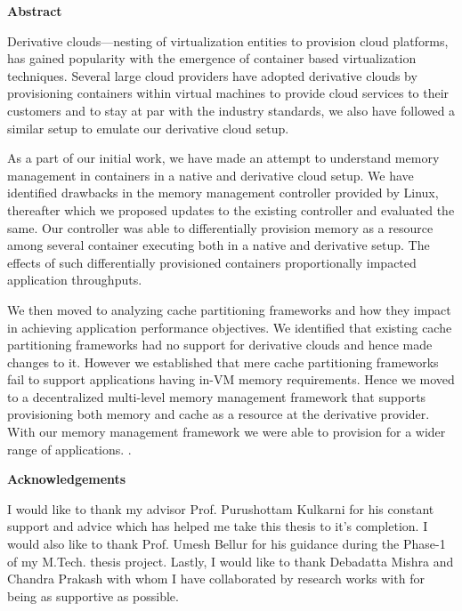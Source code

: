 \documentclass[11pt,a4paper]{report}
\begin{document}
  \begin{center}
    \huge \textbf{Abstract}
  \end{center}
  \vspace*{3em}
  \normalsize 
    
    Derivative clouds---nesting of virtualization entities to provision cloud platforms, has gained popularity 
    with the emergence of container based virtualization techniques. Several large cloud providers have adopted derivative 
    clouds by provisioning containers within virtual machines to provide cloud services to their 
    customers and to stay at par with the industry standards, we also have followed a similar setup to emulate our derivative 
    cloud setup.
    
    As a part of our initial work, we have made an attempt to understand memory management in containers in a native
    and derivative cloud setup. We have identified drawbacks in the memory management controller provided by Linux, thereafter which
    we proposed updates to the existing controller and evaluated the same. Our controller was able to differentially provision memory as
    a resource among several container executing both in a native and derivative setup. The effects of such differentially 
    provisioned containers proportionally impacted application throughputs.
    
    We then moved to analyzing cache partitioning frameworks and how they impact in achieving application performance 
    objectives. We identified that existing cache partitioning frameworks had no support for derivative clouds and
    hence made changes to it. However we established that mere cache partitioning frameworks fail to support applications 
    having in-VM memory requirements. Hence we moved to a decentralized multi-level memory management framework that
    supports provisioning both memory and cache as a resource at the derivative provider. With our memory 
    management framework we were able to provision for a wider range of applications. 
  . 
    
    \newpage
    \begin{center}
      \huge \textbf{Acknowledgements}
    \end{center}
    \vspace*{3em}
    \normalsize 
    
    I would like to thank my advisor Prof. Purushottam Kulkarni for his constant support and advice which has helped me take 
    this thesis to it’s completion. I would also like to thank Prof. Umesh Bellur for his guidance during the Phase-1 of my 
    M.Tech. thesis project. Lastly, I would like to thank Debadatta Mishra and Chandra Prakash with whom I have collaborated by 
    research works with for being as supportive as possible.
    
\end{document}
